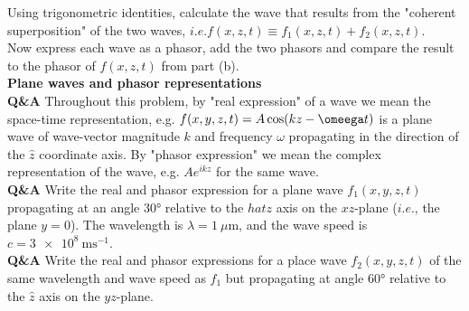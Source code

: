 \documentclass[main.tex]{subfiles}
\begin{document}
Using trigonometric identities, calculate the wave that results from the "coherent superposition" of the two waves, $i.e. f(x,z,t) \equiv f_1(x,z,t) + f_2(x,z,t)$.\\

Now express each wave as a phasor, add the two phasors and compare the result to the phasor of $f(x,z,t)$ from part (b).\\

\textbf{Plane waves and phasor representations}\\
\textbf{Q\&A} Throughout this problem, by "real expression" of a wave we mean the space-time representation, e.g. $f(x,y,z,t) = A\cos(kz-\omeega t)$ is a plane wave of wave-vector magnitude $k$ and frequency $\omega$ propagating in the direction of the $\hat{z}$ coordinate axis. By "phasor expression" we mean the complex representation of the wave, e.g. $Ae^{ikz}$ for the same wave.\\

\textbf{Q\&A} Write the real and phasor expression for a plane wave $f_1(x,y,z,t)$ propagating at an angle $\ang{30}$ relative to the $hat{z}$ axis on the $xz$-plane ($i.e.$, the plane $y=0$). The wavelength is $\lambda = \SI{1}{\mu \meter}$, and the wave speed is $c = \SI{3e8}{\metre \second^{-1}}$.\\

\textbf{Q\&A} Write the real and phasor expressions for a place wave $f_2(x,y,z,t)$ of the same wavelength and wave speed as $f_1$ but propagating at angle $\ang{60}$ relative to the $\hat{z}$ axis on the $yz$-plane.
\end{document}

